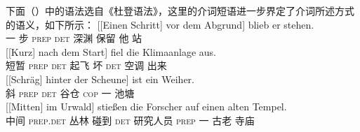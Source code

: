 下面（）中的语法选自《杜登语法》\citep[\S 1300]{Duden2005-Authors}，这里的介词短语进一步界定了介词所述方式的语义，如下所示：
\eal
\ex\label{Beispiel-Schritt-vor-dem-Abgrund} 
\gll {}[[Einen Schritt] vor dem Abgrund] blieb er stehen.\\
	 {}\spacebr{}\spacebr{}一 步 \textsc{prep} \textsc{det} 深渊 保留 他 站\\
\ex 
\gll {}[[Kurz] nach dem Start] fiel die Klimaanlage aus.\\
	 {}\spacebr{}\spacebr{}短暂 \textsc{prep} \textsc{det}  起飞 坏 \textsc{det} 空调 出来\\
\ex 
\gll {}[[Schräg] hinter der Scheune] ist ein Weiher.\\
	 {}\spacebr{}\spacebr{}斜 \textsc{prep} \textsc{det} 谷仓 \textsc{cop} 一 池塘\\
\ex 
\gll {}[[Mitten] im Urwald] stießen die Forscher auf einen alten Tempel.\\
	 {}\spacebr{}\spacebr{}中间 \textsc{prep}.\textsc{det} 丛林 碰到 \textsc{det} 研究人员 \textsc{prep} 一 古老 寺庙\\
\zl
